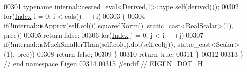 \begin{DoxyCode}
00301   \textcolor{keyword}{typename} \hyperlink{class_eigen_1_1internal_1_1_tensor_lazy_evaluator_writable}{internal::nested\_eval<Derived,1>::type} \textcolor{keyword}{self}(derived());
00302   \textcolor{keywordflow}{for}(\hyperlink{namespace_eigen_a62e77e0933482dafde8fe197d9a2cfde}{Index} i = 0; i < cols(); ++i)
00303   \{
00304     \textcolor{keywordflow}{if}(!internal::isApprox(\textcolor{keyword}{self}.col(i).squaredNorm(), static\_cast<RealScalar>(1), prec))
00305       \textcolor{keywordflow}{return} \textcolor{keyword}{false};
00306     \textcolor{keywordflow}{for}(\hyperlink{namespace_eigen_a62e77e0933482dafde8fe197d9a2cfde}{Index} j = 0; j < i; ++j)
00307       \textcolor{keywordflow}{if}(!internal::isMuchSmallerThan(\textcolor{keyword}{self}.col(i).dot(\textcolor{keyword}{self}.col(j)), static\_cast<Scalar>(1), prec))
00308         \textcolor{keywordflow}{return} \textcolor{keyword}{false};
00309   \}
00310   \textcolor{keywordflow}{return} \textcolor{keyword}{true};
00311 \}
00312 
00313 \} \textcolor{comment}{// end namespace Eigen}
00314 
00315 \textcolor{preprocessor}{#endif // EIGEN\_DOT\_H}
\end{DoxyCode}
